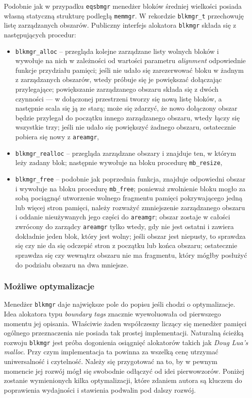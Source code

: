 \documentclass[12pt,a4paper,titlepage,twoside]{mwart}
\begin{document}
Podobnie jak w przypadku \verb+eqsbmgr+ menedżer bloków średniej wielkości
posiada własną statyczną strukturę podległą \verb+memmgr+. W rekordzie
\verb+blkmgr_t+ przechowuję listę zarządzanych obszarów. Publiczny interfejs
alokatora \verb+blkmgr+ składa się z następujących procedur:
\begin{itemize}
\item \verb+blkmgr_alloc+ -- przegląda kolejne zarządzane listy wolnych bloków
i wywołuje na nich w zależności od wartości parametru \textit{alignment}
odpowiednie funkcje przydziału pamięci; jeśli nie udało się zarezerwować bloku
w żadnym z zarządzanych obszarów, wtedy próbuje się je powiększać dołączając
przylegające; powiększanie zarządzanego obszaru składa się z dwóch czynności
--- w dołączonej przestrzeni tworzy się nową listę bloków, a następnie scala
się ją ze starą; może się zdarzyć, że nowo dołączony obszar będzie przylegał do
początku innego zarządzanego obszaru, wtedy łączy się wszystkie trzy; jeśli nie
udało się powiększyć żadnego obszaru, ostatecznie pobiera się nowy z
\texttt{areamgr},
\item \verb+blkmgr_realloc+ -- przegląda zarządzane obszary i znajduje ten, w
którym leży zadany blok; następnie wywołuje na bloku procedurę
\verb+mb_resize+,
\item \verb+blkmgr_free+ -- podobnie jak poprzednia funkcja, znajduje
odpowiedni obszar i wywołuje na bloku procedurę \verb+mb_free+; ponieważ
zwolnienie bloku mogło za sobą pociągnąć utworzenie wolnego fragmentu pamięci
pokrywającego jedną lub więcej stron pamięci, należy rozważyć zmniejszenie
zarządzanego obszaru i oddanie nieużywanych jego części do \verb+areamgr+;
obszar zostaje w całości zwrócony do zarządcy \verb+areamgr+ tylko wtedy, gdy
nie jest ostatni i zawiera dokładnie jeden blok, który jest wolny; jeśli obszar
jest niepusty, to sprawdza się czy nie da się odczepić stron z początku lub
końca obszaru; ostatecznie sprawdza się czy wewnątrz obszaru nie ma fragmentu,
który mógłby posłużyć do podziału obszaru na dwa mniejsze.
\end{itemize}

\subsubsection{Możliwe optymalizacje}

Menedżer \texttt{blkmgr} daje największe pole do popisu jeśli chodzi o
optymalizacje. Idea alokatora typu \textit{boundary tags} znacznie wyewoluowała
od pierwszego momentu jej opisania. Właściwie żaden współczesny liczący się
menedżer pamięci ogólnego przeznaczenia nie posiada tak prostej implementacji.
Naturalną ścieżką rozwoju \texttt{blkmgr} jest próba dogonienia osiągnięć
alokatorów takich jak \textit{Doug Lua's malloc}. Przy czym implementacja ta
powinna za wszelką cenę utrzymać uniwersalność i czytelność. Należy się
przygotować na to, by w pewnym momencie jej rozwój mógł się swobodnie odłączyć
od idei pierwowzorów. Poniżej zostanie wymienionych kilka optymalizacji, które
zdaniem autora są kluczem do poprawienia wydajności i stawienia podwalin pod
dalszy rozwój.
\end{document}

